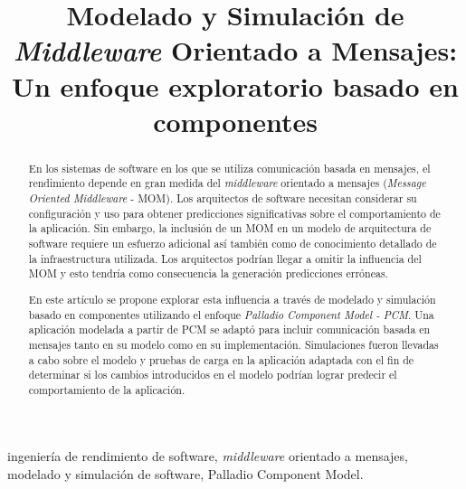 \documentclass[conference]{IEEEtran}
\begin{document}
\title{Modelado y Simulación de \emph{Middleware} Orientado a Mensajes: Un enfoque exploratorio basado en componentes \\
}

\author{
}

\maketitle

\begin{abstract}
En los sistemas de software en los que se utiliza comunicación basada en mensajes, el rendimiento depende en gran medida del \emph{middleware} orientado a mensajes (\emph{Message Oriented Middleware} - MOM). Los arquitectos de software necesitan considerar su configuración y uso para obtener predicciones significativas sobre el comportamiento de la aplicación. Sin embargo, la inclusión de un MOM en un modelo de arquitectura de software requiere un esfuerzo adicional así también como de conocimiento detallado de la infraestructura utilizada. Los arquitectos podrían llegar a omitir la influencia del MOM y esto tendría como consecuencia la generación predicciones erróneas.

En este artículo se propone explorar esta influencia a través de modelado y simulación basado en componentes utilizando el enfoque \emph{Palladio Component Model - PCM}. Una aplicación modelada a partir de PCM se adaptó para incluir comunicación basada en mensajes tanto en su modelo como en su implementación. Simulaciones fueron llevadas a cabo sobre el modelo y pruebas de carga en la aplicación adaptada con el fin de determinar si los cambios introducidos en el modelo podrían lograr predecir el comportamiento de la aplicación.



\end{abstract}

\renewcommand\IEEEkeywordsname{Palabras Clave}
\begin{IEEEkeywords}
ingeniería de rendimiento de software, \emph{middleware} orientado a mensajes, modelado y simulación de software, Palladio Component Model.
\end{IEEEkeywords}
\end{document}
